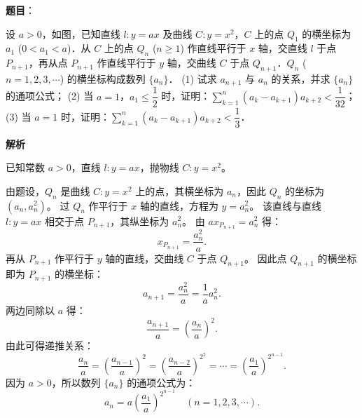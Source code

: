 \begin{answer}

\textbf{题目}：

设 $a > 0$，如图，已知直线 $l: y = ax$ 及曲线 $C: y = x^2$，$C$ 上的点 $Q_1$ 的横坐标为 $a_1$ ($0 < a_1 < a$)．从 $C$ 上的点 $Q_n$ ($n \ge 1$) 作直线平行于 $x$ 轴，交直线 $l$ 于点 $P_{n+1}$，再从点 $P_{n+1}$ 作直线平行于 $y$ 轴，交曲线 $C$ 于点 $Q_{n+1}$．$Q_n$ ($n = 1, 2, 3, \cdots$) 的横坐标构成数列 $\{a_n\}$．
(1) 试求 $a_{n+1}$ 与 $a_n$ 的关系，并求 $\{a_n\}$ 的通项公式；
(2) 当 $a = 1$，$a_1 \le \dfrac{1}{2}$ 时，证明：$\sum_{k=1}^n (a_k - a_{k+1}) a_{k+2} < \dfrac{1}{32}$；
(3) 当 $a = 1$ 时，证明：$\sum_{k=1}^n (a_k - a_{k+1}) a_{k+2} < \dfrac{1}{3}$．
\nopagebreak[4]
\begin{center}\end{center}
\nopagebreak[4]
\textbf{解析}

已知常数 $a > 0$，直线 $l: y = ax$，抛物线 $C: y = x^2$。


由题设，$Q_n$ 是曲线 $C: y = x^2$ 上的点，其横坐标为 $a_n$，因此 $Q_n$ 的坐标为 $(a_n, a_n^2)$。
过 $Q_n$ 作平行于 $x$ 轴的直线，方程为 $y = a_n^2$。
该直线与直线 $l: y = ax$ 相交于点 $P_{n+1}$，其纵坐标为 $a_n^2$。
由 $a x_{P_{n+1}} = a_n^2$ 得：
\nopagebreak[4]
\[x_{P_{n+1}} = \frac{a_n^2}{a}.\]
再从 $P_{n+1}$ 作平行于 $y$ 轴的直线，交曲线 $C$ 于点 $Q_{n+1}$。
因此点 $Q_{n+1}$ 的横坐标即为 $P_{n+1}$ 的横坐标：
\nopagebreak[4]
\[a_{n+1} = \frac{a_n^2}{a} = \frac{1}{a} a_n^2.\]
两边同除以 $a$ 得：
\nopagebreak[4]
\[\frac{a_{n+1}}{a} = \left(\frac{a_n}{a}\right)^2.\]
由此可得递推关系：
\nopagebreak[4]
\[\frac{a_n}{a} = \left(\frac{a_{n-1}}{a}\right)^2 = \left(\frac{a_{n-2}}{a}\right)^{2^2} = \cdots = \left(\frac{a_1}{a}\right)^{2^{n-1}}.\]
因为 $a > 0$，所以数列 $\{a_n\}$ 的通项公式为：
\nopagebreak[4]
\[a_n = a \left(\frac{a_1}{a}\right)^{2^{n-1}} \quad (n = 1, 2, 3, \cdots).\]



\end{answer}
